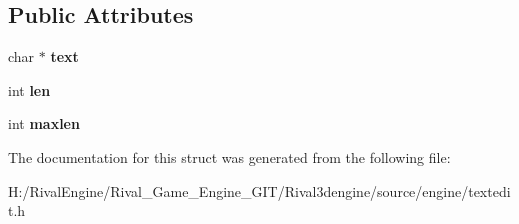 \subsection*{Public Attributes}
\begin{DoxyCompactItemize}
\item 
\mbox{\label{structeditline_aca6722eaec92a332e2f5f19a0218346f}} 
char $\ast$ {\bfseries text}
\item 
\mbox{\label{structeditline_aedf4d62cf6b138c761b9f1bb2df3fdba}} 
int {\bfseries len}
\item 
\mbox{\label{structeditline_abec5185ee12832521ad20127df5f818d}} 
int {\bfseries maxlen}
\end{DoxyCompactItemize}


The documentation for this struct was generated from the following file\+:\begin{DoxyCompactItemize}
\item 
H\+:/\+Rival\+Engine/\+Rival\+\_\+\+Game\+\_\+\+Engine\+\_\+\+G\+I\+T/\+Rival3dengine/source/engine/textedit.\+h\end{DoxyCompactItemize}
